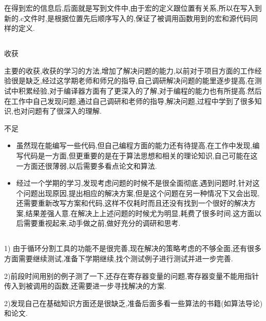 \begin{itemize}
{     在得到宏的信息后,后面就是写到文件中,由于宏的定义跟位置有关系,所以在写入到新的.c文件时,是根据位置先后顺序写入的,保证了被调用函数用到的宏和源代码同样的定义.     
}


\end{itemize}

\subsection{}
\par{收获}
\par{主要的收获,收获的学习的方法,增加了解决问题的能力,以前对于项目方面的工作经验很是缺乏,经过这学期老师和师兄的指导,自己调研解决问题的能里逐步提高,在测试中积累经验,对于编译器方面有了更深入的了解,对于编程的能力也有所提高.然后在工作中自己发现问题,通过自己调研和老师的指导,解决问题,过程中学到了很多知识,也对问题有了很深入的理解.}

\par{不足}
\begin{itemize}

\item{虽然现在能编写一些代码,但自己编程方面的能力还有待提高,在工作中发现,编写代码是一方面,但更重要的是在于算法思想和相关的理论知识,自己可能在这一方面还很薄弱,以后需要多看点论文和算法.}

\item{经过一个学期的学习,发现考虑问题的时候不是很全面彻底,遇到问题时,针对这个问题出现原因,提出相应的解决方案,但是这个问题在另一种情况下又会出现,还需要重新改写方案和代码,这样不仅耗时而且还没有找到一个很好的解决方案,结果差强人意.在解决上上述问题的时候尤为明显,耗费了很多时间.这方面以后需要重视起来,动手做之前,做好充分的调研和思考.}

\end{itemize}

\subsection{}

1) 由于循环分割工具的功能不是很完善,现在解决的策略考虑的不够全面,还有很多方面需要继续测试,准备下学期继续,找个测试例子进行测试并进一步完善.

2)前段时间用别的例子测了一下,还存在寄存器变量的问题,寄存器变量不能用指针传入到被调用的函数,还需要进一步寻找解决的方案.


2)发现自己在基础知识方面还是很缺乏,准备后面多看一些算法的书籍(如算法导论)和论文.
